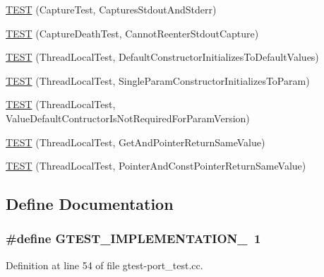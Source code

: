 \begin{DoxyCompactItemize}
\item 
\hyperlink{namespacetesting_1_1internal_a341ff65f3ca44b27fc51f03a9a05bee8}{\-T\-E\-S\-T} (\-Capture\-Test, \-Captures\-Stdout\-And\-Stderr)
\item 
\hyperlink{namespacetesting_1_1internal_a325a786fb22b87e5aa8d8f584b42ab09}{\-T\-E\-S\-T} (\-Capture\-Death\-Test, \-Cannot\-Reenter\-Stdout\-Capture)
\item 
\hyperlink{namespacetesting_1_1internal_af366e28e373f36480decc2ea586f48f0}{\-T\-E\-S\-T} (\-Thread\-Local\-Test, \-Default\-Constructor\-Initializes\-To\-Default\-Values)
\item 
\hyperlink{namespacetesting_1_1internal_a5a52dd578217050e621ebd2aace97a70}{\-T\-E\-S\-T} (\-Thread\-Local\-Test, \-Single\-Param\-Constructor\-Initializes\-To\-Param)
\item 
\hyperlink{namespacetesting_1_1internal_a6dffc8331590224259b60e855ad07d03}{\-T\-E\-S\-T} (\-Thread\-Local\-Test, \-Value\-Default\-Contructor\-Is\-Not\-Required\-For\-Param\-Version)
\item 
\hyperlink{namespacetesting_1_1internal_a0e7c2d58a313bec0821df19f44351d84}{\-T\-E\-S\-T} (\-Thread\-Local\-Test, \-Get\-And\-Pointer\-Return\-Same\-Value)
\item 
\hyperlink{namespacetesting_1_1internal_aaed45d6ba960f02e8d3d042c606bc98e}{\-T\-E\-S\-T} (\-Thread\-Local\-Test, \-Pointer\-And\-Const\-Pointer\-Return\-Same\-Value)
\end{DoxyCompactItemize}


\subsection{\-Define \-Documentation}
\hypertarget{gtest-port__test_8cc_a83bd232fd1077579fada92c31bb7469f}{
\subsubsection[{\-G\-T\-E\-S\-T\-\_\-\-I\-M\-P\-L\-E\-M\-E\-N\-T\-A\-T\-I\-O\-N\-\_\-}]{\setlength{\rightskip}{0pt plus 5cm}\#define {\bf \-G\-T\-E\-S\-T\-\_\-\-I\-M\-P\-L\-E\-M\-E\-N\-T\-A\-T\-I\-O\-N\-\_\-}~1}}\label{d1/df3/gtest-port__test_8cc_a83bd232fd1077579fada92c31bb7469f}


\-Definition at line 54 of file gtest-\/port\-\_\-test.\-cc.

